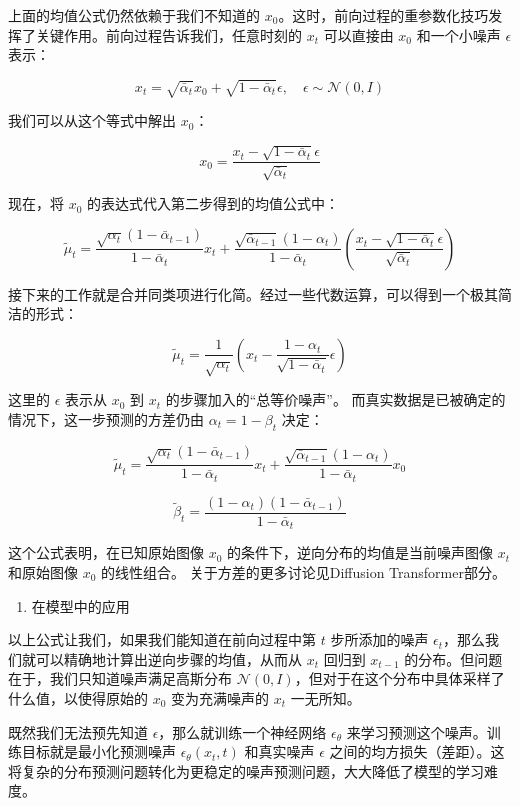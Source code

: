上面的均值公式仍然依赖于我们不知道的 \(x_0\)。这时，前向过程的重参数化技巧发挥了关键作用。前向过程告诉我们，任意时刻的 \(x_t\) 可以直接由 \(x_0\) 和一个小噪声 \(\epsilon\) 表示：

\[
x_t=\sqrt{\bar{\alpha}_t}x_0+\sqrt{1-\bar{\alpha}_t}\epsilon,\quad \epsilon\sim\mathcal{N}(0,I)
\]

我们可以从这个等式中解出 \(x_0\)：

\[
x_0=\frac{x_t-\sqrt{1-\bar{\alpha}_t}\epsilon}{\sqrt{\bar{\alpha}_t}}
\]

现在，将 \(x_0\) 的表达式代入第二步得到的均值公式中：

\[
\tilde{\mu}_t=
\frac{\sqrt{\alpha_t}(1-\bar{\alpha}_{t-1})}{1-\bar{\alpha}_t}x_t
+\frac{\sqrt{\bar{\alpha}_{t-1}}(1-\alpha_t)}{1-\bar{\alpha}_t}
\left(\frac{x_t-\sqrt{1-\bar{\alpha}_t}\epsilon}{\sqrt{\bar{\alpha}_t}}\right)
\]

接下来的工作就是合并同类项进行化简。经过一些代数运算，可以得到一个极其简洁的形式：

\[
\tilde{\mu}_t=\frac{1}{\sqrt{\alpha_t}}
\left(x_t-\frac{1-\alpha_t}{\sqrt{1-\bar{\alpha}_t}}\epsilon\right)
\]

这里的 \(\epsilon\) 表示从 \(x_0\) 到 \(x_t\) 的步骤加入的``总等价噪声''。
而真实数据是已被确定的情况下，这一步预测的方差仍由 \(\alpha_t=1-\beta_t\) 决定：

\[
\tilde{\mu}_t=
\frac{\sqrt{\alpha_t}(1-\bar{\alpha}_{t-1})}{1-\bar{\alpha}_t}x_t
+\frac{\sqrt{\bar{\alpha}_{t-1}}(1-\alpha_t)}{1-\bar{\alpha}_t}x_0
\]

\[
\tilde{\beta}_t=\frac{(1-\alpha_t)(1-\bar{\alpha}_{t-1})}{1-\bar{\alpha}_t}
\]

这个公式表明，在已知原始图像 \(x_0\) 的条件下，逆向分布的均值是当前噪声图像 \(x_t\) 和原始图像 \(x_0\) 的线性组合。
关于方差的更多讨论见Diffusion Transformer部分。

\begin{enumerate}
\def\labelenumi{\arabic{enumi}.}
\setcounter{enumi}{1}
\tightlist
\item
  在模型中的应用
\end{enumerate}

以上公式让我们，如果我们能知道在前向过程中第 \(t\) 步所添加的噪声 \(\epsilon_t\)，那么我们就可以精确地计算出逆向步骤的均值，从而从 \(x_t\) 回归到 \(x_{t-1}\) 的分布。但问题在于，我们只知道噪声满足高斯分布 \(\mathcal{N}(0,I)\)，但对于在这个分布中具体采样了什么值，以使得原始的 \(x_0\) 变为充满噪声的 \(x_t\) 一无所知。

既然我们无法预先知道 \(\epsilon\)，那么就训练一个神经网络 \(\epsilon_\theta\) 来学习预测这个噪声。训练目标就是最小化预测噪声 \(\epsilon_\theta(x_t,t)\) 和真实噪声 \(\epsilon\) 之间的均方损失（差距）。这将复杂的分布预测问题转化为更稳定的噪声预测问题，大大降低了模型的学习难度。

